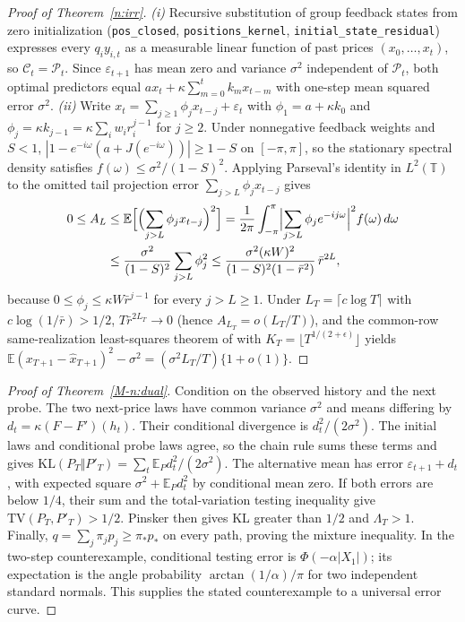 \documentclass[12pt]{article}
\theoremstyle{definition}
\theoremstyle{remark}
\begin{document}
\begin{proof}[Proof of Theorem~\ref{n:irr}]
\emph{(i)} Recursive substitution of group feedback states from zero initialization (\nolinkurl{pos_closed}, \nolinkurl{positions_kernel}, \nolinkurl{initial_state_residual}) expresses every $q_i y_{i,t}$ as a measurable linear function of past prices $(x_0,\ldots,x_t)$, so $\mathcal{C}_t = \mathcal{P}_t$. Since $\varepsilon_{t+1}$ has mean zero and variance $\sigma^2$ independent of $\mathcal{P}_t$, both optimal predictors equal $a x_t + \kappa\sum_{m=0}^t k_m x_{t-m}$ with one-step mean squared error $\sigma^2$.
\emph{(ii)} Write $x_t = \sum_{j \ge 1} \phi_j x_{t-j} + \varepsilon_t$ with $\phi_1 = a + \kappa k_0$ and $\phi_j = \kappa k_{j-1} = \kappa\sum_i w_i r_i^{j-1}$ for $j \ge 2$. Under nonnegative feedback weights and $S < 1$, $|1 - e^{-i\omega}(a + J(e^{-i\omega}))| \ge 1 - S$ on $[-\pi,\pi]$, so the stationary spectral density satisfies $f(\omega) \le \sigma^2/(1-S)^2$. Applying Parseval's identity in $L^2(\mathbb{T})$ to the omitted tail projection error $\sum_{j > L} \phi_j x_{t-j}$ gives
\[\begin{aligned}
  0 \le A_L &\le \mathbb{E}\Bigl[\Bigl(\sum_{j > L} \phi_j x_{t-j}\Bigr)^2\Bigr]  = \frac{1}{2\pi}\int_{-\pi}^{\pi} \Bigl|\sum_{j > L} \phi_j e^{-ij\omega}\Bigr|^2 f(\omega)\,d\omega \\
  &\le \frac{\sigma^2}{(1-S)^2} \sum_{j > L} \phi_j^2  \le \frac{\sigma^2(\kappa W)^2}{(1-S)^2(1-\bar r^2)}\,\bar r^{2L},
\end{aligned}\]
because $0 \le \phi_j \le \kappa W \bar{r}^{j-1}$ for every $j > L \ge 1$. Under $L_T = \lceil c\log T\rceil$ with $c\log(1/\bar{r}) > 1/2$, $T \bar{r}^{2L_T} \to 0$ (hence $A_{L_T} = o(L_T/T)$), and the common-row same-realization least-squares theorem of \citet[Proposition~2]{ingwei2005} with $K_T = \lfloor T^{1/(2+\epsilon)}\rfloor$ yields $\mathbb{E}(x_{T+1} - \hat{x}_{T+1})^2 - \sigma^2 = (\sigma^2 L_T/T)\{1 + o(1)\}$.
\end{proof}

\begin{proof}[Proof of Theorem~\ref{M-n:dual}]
Condition on the observed history and the next probe. The two next-price laws have common variance $\sigma^2$ and means differing by $d_t=\kappa(F-F')(h_t)$. Their conditional divergence is $d_t^2/(2\sigma^2)$. The initial laws and conditional probe laws agree, so the chain rule sums these terms and gives $\mathrm{KL}(P_T\Vert P'_T)=\sum_t\mathbb E_Pd_t^2/(2\sigma^2)$. The alternative mean has error $\varepsilon_{t+1}+d_t$, with expected square $\sigma^2+\mathbb E_Pd_t^2$ by conditional mean zero. If both errors are below $1/4$, their sum and the total-variation testing inequality give $\mathrm{TV}(P_T,P'_T)>1/2$. Pinsker then gives KL greater than $1/2$ and $\Lambda_T>1$. Finally, $q=\sum_j\pi_jp_j\ge\pi_*p_*$ on every path, proving the mixture inequality. In the two-step counterexample, conditional testing error is $\Phi(-\alpha|X_1|)$; its expectation is the angle probability $\arctan(1/\alpha)/\pi$ for two independent standard normals. This supplies the stated counterexample to a universal error curve.
\end{proof}
\end{document}
